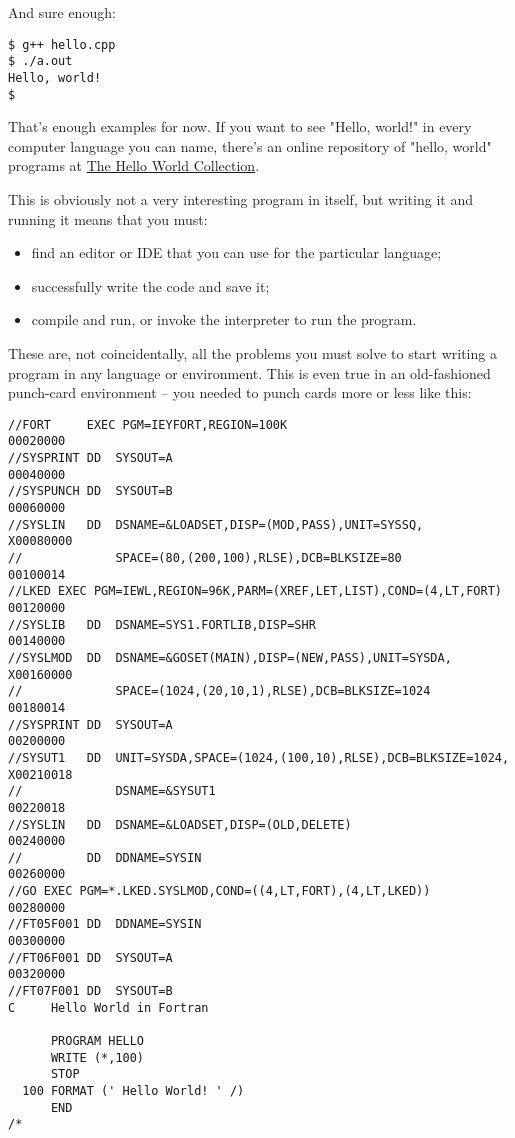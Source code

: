 \documentclass[11pt]{article}
\begin{document}
And sure enough:
\begin{verbatim}
$ g++ hello.cpp
$ ./a.out
Hello, world!
$
\end{verbatim}

That's enough examples for now. If you want to see "Hello, world!" in
every computer language you can name, there's an online repository of
"hello, world" programs at \href{https://helloworldcollection.github.io/}{The Hello World Collection}.

This is obviously not a very interesting program in itself, but
writing it and running it means that you must:

\begin{itemize}
\item find an editor or IDE that you can use for the particular language;
\item successfully write the code and save it;
\item compile and run, or invoke the interpreter to run the program.
\end{itemize}

These are, not coincidentally, all the problems you must solve to
start writing a program in any language or environment. This is even
true in an old-fashioned punch-card environment -- you needed to punch
cards more or less like this:

\begin{verbatim}
//FORT     EXEC PGM=IEYFORT,REGION=100K                                 00020000
//SYSPRINT DD  SYSOUT=A                                                 00040000
//SYSPUNCH DD  SYSOUT=B                                                 00060000
//SYSLIN   DD  DSNAME=&LOADSET,DISP=(MOD,PASS),UNIT=SYSSQ,             X00080000
//             SPACE=(80,(200,100),RLSE),DCB=BLKSIZE=80                 00100014
//LKED EXEC PGM=IEWL,REGION=96K,PARM=(XREF,LET,LIST),COND=(4,LT,FORT)   00120000
//SYSLIB   DD  DSNAME=SYS1.FORTLIB,DISP=SHR                             00140000
//SYSLMOD  DD  DSNAME=&GOSET(MAIN),DISP=(NEW,PASS),UNIT=SYSDA,         X00160000
//             SPACE=(1024,(20,10,1),RLSE),DCB=BLKSIZE=1024             00180014
//SYSPRINT DD  SYSOUT=A                                                 00200000
//SYSUT1   DD  UNIT=SYSDA,SPACE=(1024,(100,10),RLSE),DCB=BLKSIZE=1024, X00210018
//             DSNAME=&SYSUT1                                           00220018
//SYSLIN   DD  DSNAME=&LOADSET,DISP=(OLD,DELETE)                        00240000
//         DD  DDNAME=SYSIN                                             00260000
//GO EXEC PGM=*.LKED.SYSLMOD,COND=((4,LT,FORT),(4,LT,LKED))             00280000
//FT05F001 DD  DDNAME=SYSIN                                             00300000
//FT06F001 DD  SYSOUT=A                                                 00320000
//FT07F001 DD  SYSOUT=B            
C     Hello World in Fortran

      PROGRAM HELLO
      WRITE (*,100)
      STOP
  100 FORMAT (' Hello World! ' /)
      END
/*
\end{verbatim}
\end{document}
